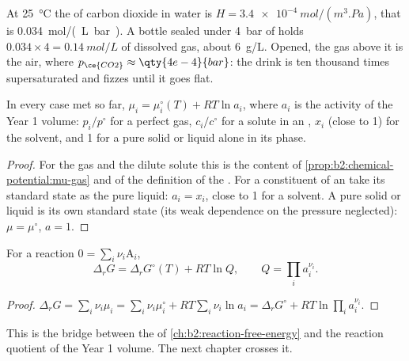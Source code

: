 \begin{example}\label{ex:b2:chemical-potential:soda}
At \qty{25}{\celsius} the  of carbon dioxide in water is $H =
\qty{3.4e-4}{mol/(m^3.Pa)}$, that is \qty{0.034}{mol/(L.bar)}. A bottle
sealed under \qty{4}{bar} of  holds $0.034 \times 4 =
\qty{0.14}{mol/L}$ of dissolved gas, about \qty{6}{g/L}. Opened, the gas
above it is the air, where $p_{\ce{CO2}} \approx \qty{4e-4}{bar}$: the drink is
ten thousand times supersaturated and fizzes until it goes flat.
\end{example}

\begin{proposition}\label{prop:b2:chemical-potential:activity}
In every case met so far, $\mu_i = \mu_i^\circ(T) + RT\ln a_i$, where $a_i$
is the activity of the Year 1 volume: $p_i/p^\circ$ for a perfect gas,
$c_i/c^\circ$ for a solute in an , $x_i$ (close to 1)
for the solvent, and 1 for a pure solid or liquid alone in its phase.
\end{proposition}

\begin{proof}
For the gas and the dilute solute this is the content of
\cref{prop:b2:chemical-potential:mu-gas} and of the definition of the . For a constituent of an  take its standard
state as the pure liquid: $a_i = x_i$, close to 1 for a solvent. A pure solid
or liquid is its own standard state (its weak dependence on the pressure
neglected): $\mu = \mu^\circ$, $a = 1$.
\end{proof}

\begin{proposition}\label{prop:b2:chemical-potential:delta-g-q}
For a reaction $0 = \sum_i\nu_i\mathrm A_i$,
\[
  \Delta_r G = \Delta_r G^\circ(T) + RT\ln Q, \qquad Q = \prod_i a_i^{\nu_i} .
\]
\end{proposition}

\begin{proof}
$\Delta_r G = \sum_i\nu_i\mu_i = \sum_i\nu_i\mu_i^\circ + RT\sum_i\nu_i\ln a_i =
\Delta_r G^\circ + RT\ln\prod_i a_i^{\nu_i}$.
\end{proof}

This is the bridge between the  of \cref{ch:b2:reaction-free-energy}
and the reaction quotient of the Year 1 volume. The next chapter crosses it.

